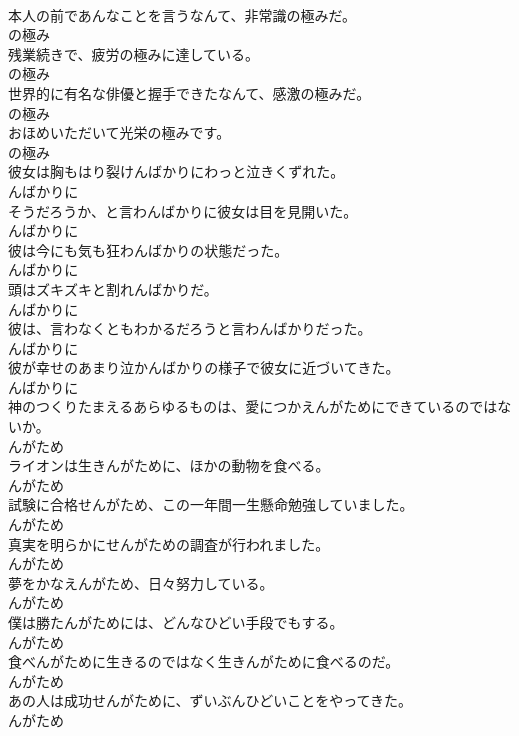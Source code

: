 \documentclass[8pt]{extreport}
\begin{document}
\begin{CJK}{UTF8}{min}
\\	本人の前であんなことを言うなんて、非常識の極みだ。	
\\	の極み
\\	残業続きで、疲労の極みに達している。	
\\	の極み
\\	世界的に有名な俳優と握手できたなんて、感激の極みだ。	
\\	の極み
\\	おほめいただいて光栄の極みです。	
\\	の極み
\\	彼女は胸もはり裂けんばかりにわっと泣きくずれた。	
\\	んばかりに
\\	そうだろうか、と言わんばかりに彼女は目を見開いた。	
\\	んばかりに
\\	彼は今にも気も狂わんばかりの状態だった。	
\\	んばかりに
\\	頭はズキズキと割れんばかりだ。	
\\	んばかりに
\\	彼は、言わなくともわかるだろうと言わんばかりだった。	
\\	んばかりに
\\	彼が幸せのあまり泣かんばかりの様子で彼女に近づいてきた。	
\\	んばかりに
\\	神のつくりたまえるあらゆるものは、愛につかえんがためにできているのではないか。	
\\	んがため
\\	ライオンは生きんがために、ほかの動物を食べる。	
\\	んがため
\\	試験に合格せんがため、この一年間一生懸命勉強していました。	
\\	んがため
\\	真実を明らかにせんがための調査が行われました。	
\\	んがため
\\	夢をかなえんがため、日々努力している。	
\\	んがため
\\	僕は勝たんがためには、どんなひどい手段でもする。	
\\	んがため
\\	食べんがために生きるのではなく生きんがために食べるのだ。	
\\	んがため
\\	あの人は成功せんがために、ずいぶんひどいことをやってきた。	
\\	んがため

\end{CJK}
\end{document}

